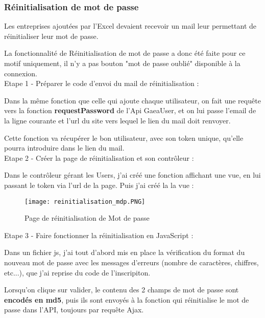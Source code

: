 \subsubsection{Réinitialisation de mot de passe}


Les entreprises ajoutées par l'Excel devaient recevoir un mail leur permettant de réinitialiser leur mot de passe.

La fonctionnalité de Réinitialisation de mot de passe a donc été faite pour ce motif uniquement, il n'y a pas bouton "mot de passe oublié" disponible à la connexion.\\

Etape 1 - Préparer le code d'envoi du mail de réinitialisation : 

Dans la même fonction que celle qui ajoute chaque utilisateur, on fait une requête vers la fonction \textbf{requestPassword} de l'Api GaeaUser, et on lui passe l'email de la ligne courante et l'url du site vers lequel le lien du mail doit renvoyer.

Cette fonction va récupérer le bon utilisateur, avec son token unique, qu'elle pourra introduire dans le lien du mail.\\

Etape 2 - Créer la page de réinitialisation et son contrôleur : 

Dans le contrôleur gérant les Users, j'ai créé une fonction affichant une vue, en lui passant le token via l'url de la page.
Puis j'ai créé la la vue :

\begin{figure}[H]
    \texttt{[image: reinitialisation\_mdp.PNG]}
    \caption{Page de réinitialisation de Mot de passe}
\end{figure}

Etape 3 - Faire fonctionner la réinitialisation en JavaScript :

Dans un fichier js, j'ai tout d'abord mis en place la vérification du format du nouveau mot de passe avec les messages d'erreurs (nombre de caractères, chiffres, etc...), que j'ai reprise du code de l'inscripiton.

Lorsqu'on clique sur valider, le contenu des 2 champs de mot de passe sont \textbf{encodés en md5}, puis ils sont envoyés à la fonction qui réinitialise le mot de passe dans l'API, toujours par requête Ajax.

